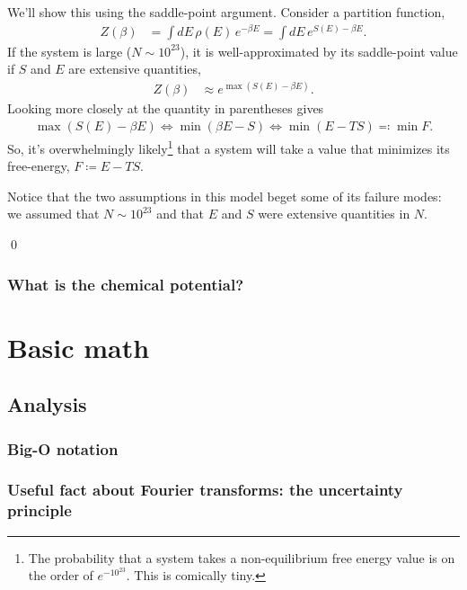 \documentclass[11pt]{article}
\begin{document}
We'll show this using the saddle-point argument. Consider a partition function,
\begin{align*}
Z(\beta) & = \int dE\, \rho(E)\, e^{-\beta E} = \int dE\, e^{S(E) - \beta E}.
\end{align*}
If the system is large ($N \sim 10^{23}$), it is well-approximated 
by its saddle-point value if $S$ and $E$ are extensive quantities,
\begin{align*}
Z(\beta) & \approx e^{\max(S(E) - \beta E)}.
\end{align*}
Looking more closely at the quantity in parentheses gives
\begin{align*}
    \max(S(E) - \beta E) \iff \min(\beta E - S) \iff \min(E - TS) \eqqcolon \min{F}.
\end{align*}
So, it's overwhelmingly likely\footnote{The probability that a system takes a
non-equilibrium free energy value is on the order of $e^{-10^{23}}$. This is
comically tiny.} that a system will take a value that 
minimizes its free-energy, $F \coloneqq E - TS$.

Notice that the two assumptions in this model beget some of its failure modes:
we assumed that $N \sim 10^{23}$ and that $E$ and $S$ were extensive quantities
in $N$. 

\qed

\subsubsection{What is the chemical potential?}


\newpage

\section{Basic math}

\subsection{Analysis}

\subsubsection{Big-O notation}


\subsubsection{Useful fact about Fourier transforms: the uncertainty principle}
\end{document}
